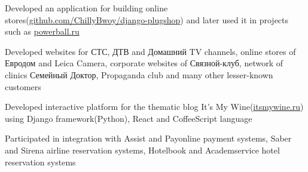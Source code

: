 \documentclass[11pt,a4paper,sans]{moderncv}
\newcommand{\lang}[2]{#2}
\begin{document}
\cvlistitem
    {\lang
        {Разработал приложение \href{https://github.com/ChillyBwoy/django-plugshop}{django-plugshop}, на основе которого в дальнейшем было создано несколько интернет-магазинов, например deathstar.ru и \href{http://powerball.ru}{powerball.ru}}
        {Developed an application for building online stores(\href{https://github.com/ChillyBwoy/django-plugshop}{github.com/ChillyBwoy/django-plugshop})} and later used it in projects such as \href{http://powerball.ru}{powerball.ru}}

\cvlistitem
    {\lang
        {Делал сайты для телеканалов СТС, ДТВ и Домашний, интернет-магазина «Евродом», фотоаппаратов «Leica Camera», «Связного-клуба», сети поликлиник «Семейный Доктор», клуба «Пропаганда», кафе «Filial»(\href{http://filialmoscow.com/ru/}{filialmoscow.com}), торгово-офисного центра «Гименей»(\href{http://himeney.ru}{himeney.ru}) и многих других менее известных клиентов}
        {Developed websites for {\textquotedbl}СТС{\textquotedbl}, {\textquotedbl}ДТВ{\textquotedbl} and {\textquotedbl}Домашний{\textquotedbl} TV channels, online stores of {\textquotedbl}Евродом{\textquotedbl} and {\textquotedbl}Leica Camera{\textquotedbl}, corporate websites of {\textquotedbl}Связной-клуб{\textquotedbl}, network of clinics {\textquotedbl}Семейный Доктор{\textquotedbl}, {\textquotedbl}Propaganda club{\textquotedbl} and many other lesser-known customers}}


\cvlistitem
    {\lang
        {TODO}
        {Developed interactive platform for the thematic blog {\textquotedbl}It's My Wine{\textquotedbl}(\href{http://itsmywine.ru}{itsmywine.ru}) using Django framework(Python), React and CoffeeScript language}}


\cvlistitem
    {\lang
        {Занимался интеграцией с платёжными системами Assist и Payonline, системами бронирования авиабилетов Sabre и Sirena, системами бронирования отелей Hotelbook и Академсервис}
        {Participated in integration with {\textquotedbl}Assist{\textquotedbl} and {\textquotedbl}Payonline{\textquotedbl} payment systems, {\textquotedbl}Saber{\textquotedbl} and {\textquotedbl}Sirena{\textquotedbl} airline reservation systems, {\textquotedbl}Hotelbook{\textquotedbl} and {\textquotedbl}Academservice{\textquotedbl} hotel reservation systems}\\}





\end{document}
